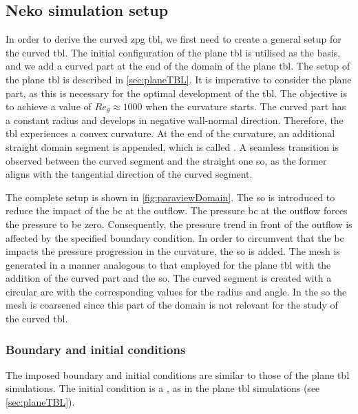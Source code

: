 \subsection{Neko simulation setup}

In order to derive the curved \acrshort{zpg} \acrshort{tbl}, we first need to create a general setup for the curved \acrshort{tbl}. 
The initial configuration of the plane  \acrshort{tbl} is utilised as the basis, and we add a curved part at the end of the domain of the plane \acrshort{tbl}. 
The setup of the plane \acrshort{tbl} is described in \autoref{sec:planeTBL}.
It is imperative to consider the plane part, as this is necessary for the optimal development of the \acrshort{tbl}. The objective is to achieve
a value of $Re_{\theta} \approx 1000$ when the curvature starts. 
The curved part has a constant radius and develops in negative wall-normal direction. 
Therefore, the \acrshort{tbl} experiences a convex curvature. 
At the end of the curvature, an additional straight domain segment is appended, which is called .
A seamless transition is observed between the curved segment and the straight one \acrlong{so}, as the former aligns with the tangential direction of the curved segment. 

The complete setup is shown in \autoref{fig:paraviewDomain}.
The \acrlong{so} is introduced to reduce the impact of the \acrlong{bc} at the outflow. 
The pressure \acrshort{bc} at the outflow forces the pressure to be zero.
Consequently, the pressure trend in front of the outflow is affected by the specified boundary condition.
In order to circumvent  that the \acrshort{bc} impacts the pressure progression in the curvature, the \acrlong{so} is added.
The mesh is generated in a manner analogous to that employed for the plane  \acrshort{tbl} with the addition of the curved part and the \acrlong{so}.
The curved segment is created with a circular arc with the corresponding values for the radius and angle.
In the \acrlong{so} the mesh is coarsened since this part of the domain is not relevant for the study of the curved \acrshort{tbl}. \\

\subsubsection{Boundary and initial conditions}
The imposed boundary and initial conditions are similar to those of the plane \acrshort{tbl} simulations.
The initial condition is a , as in the plane \acrshort{tbl} simulations (see \autoref{sec:planeTBL}).

